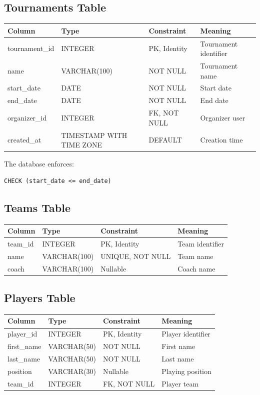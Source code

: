\documentclass[11pt,a4paper]{article}
\begin{document}
\subsection{Tournaments Table}

\begin{longtable}{llll}
\toprule
\textbf{Column} & \textbf{Type} & \textbf{Constraint} & \textbf{Meaning}\\
\midrule
tournament\_id & INTEGER & PK, Identity & Tournament identifier\\
name & VARCHAR(100) & NOT NULL & Tournament name\\
start\_date & DATE & NOT NULL & Start date\\
end\_date & DATE & NOT NULL & End date\\
organizer\_id & INTEGER & FK, NOT NULL & Organizer user\\
created\_at & TIMESTAMP WITH TIME ZONE & DEFAULT & Creation time\\
\bottomrule
\end{longtable}

The database enforces:

\begin{lstlisting}
CHECK (start_date <= end_date)
\end{lstlisting}

\subsection{Teams Table}

\begin{longtable}{llll}
\toprule
\textbf{Column} & \textbf{Type} & \textbf{Constraint} & \textbf{Meaning}\\
\midrule
team\_id & INTEGER & PK, Identity & Team identifier\\
name & VARCHAR(100) & UNIQUE, NOT NULL & Team name\\
coach & VARCHAR(100) & Nullable & Coach name\\
\bottomrule
\end{longtable}

\subsection{Players Table}

\begin{longtable}{llll}
\toprule
\textbf{Column} & \textbf{Type} & \textbf{Constraint} & \textbf{Meaning}\\
\midrule
player\_id & INTEGER & PK, Identity & Player identifier\\
first\_name & VARCHAR(50) & NOT NULL & First name\\
last\_name & VARCHAR(50) & NOT NULL & Last name\\
position & VARCHAR(30) & Nullable & Playing position\\
team\_id & INTEGER & FK, NOT NULL & Player team\\
\bottomrule
\end{longtable}
\end{document}
